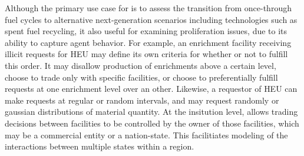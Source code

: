 Although the primary use case for \Cyclus is to assess the transition from once-through fuel cycles to alternative next-generation scenarios including technologies such as spent fuel recycling, it also useful for examining proliferation issues, due to its ability to capture agent behavior. For example, an enrichment facility receiving illicit requests for \gls{HEU} may define its own criteria for whether or not to fulfill this order.  It may disallow production of enrichments above a certain level, choose to trade only with specific facilities, or choose to preferentially fulfill requests at one enrichment level over an other.  Likewise, a requestor of \gls{HEU} can make requests at regular or random intervals, and may request randomly or gaussian distributions of material quantity.  At the insitution level, \Cyclus allows trading decisions between facilities to be controlled by the owner of those facilities, which may be a commercial entity or a nation-state.  This facilitiates modeling of the interactions between multiple states within a region.  





